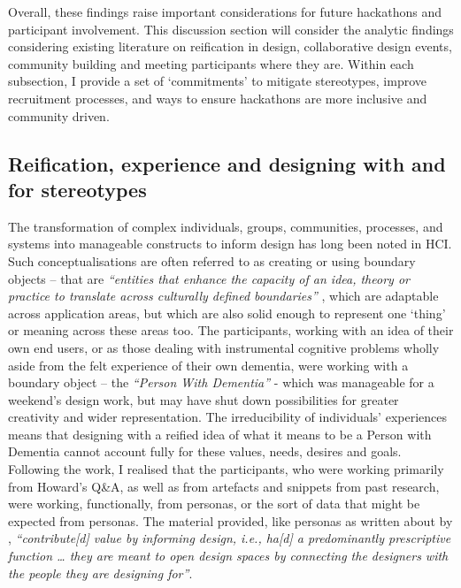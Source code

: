 Overall, these findings raise important considerations for future hackathons and participant involvement. This discussion section will consider the analytic findings considering existing literature on reification in design, collaborative design events, community building and meeting participants where they are. Within each subsection, I provide a set of `commitments' to mitigate stereotypes, improve recruitment processes, and ways to ensure hackathons are more inclusive and community driven. 

\subsection{Reification, experience and designing with and for stereotypes}
\label{DiscussionPartOne}
The transformation of complex individuals, groups, communities, processes, and systems into manageable constructs to inform design has long been noted in HCI. Such conceptualisations are often referred to as creating or using boundary objects – that are \textit{``entities that enhance the capacity of an idea, theory or practice to translate across culturally defined boundaries''} \cite[pg.71]{fox2011boundary}, which are adaptable across application areas, but which are also solid enough to represent one `thing' or meaning across these areas too. The participants, working with an idea of their own end users, or as those dealing with instrumental cognitive problems wholly aside from the felt experience of their own dementia, were working with a boundary object – the \textit{``Person With Dementia''} - which was manageable for a weekend’s design work, but may have shut down possibilities for greater creativity and wider representation. The irreducibility of individuals’ experiences means that designing with a reified idea of what it means to be a Person with Dementia cannot account fully for these values, needs, desires and goals. Following the work, I realised that the participants, who were working primarily from Howard’s Q\&A, as well as from artefacts and snippets from past research, were working, functionally, from personas, or the sort of data that might be expected from personas. The material provided, like personas as written about by \cite{marsden_stereotypes_2016}, \textit{``contribute[d] value by informing design, i.e., ha[d] a predominantly prescriptive function … they are meant to open design spaces by connecting the designers with the people they are designing for''}. 

